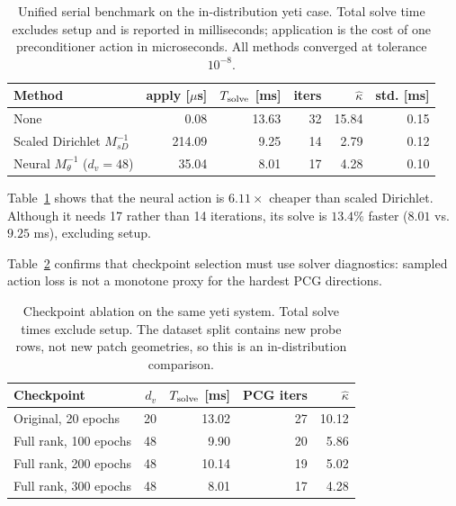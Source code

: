 \documentclass{article}
\newcommand{\Psd}{M_{sD}^{-1}}                   %
\newcommand{\Pneural}{M_{\theta}^{-1}}            %
\newcommand{\dv}{d_v}                             %
\theoremstyle{plain}
\numberwithin{equation}{section}
\begin{document}
\begin{table}[ht]
    \centering
    \caption{Unified serial benchmark on the in-distribution yeti case.  Total
        solve time excludes setup and is reported in milliseconds; application is
        the cost of one preconditioner action in microseconds.  All methods converged
        at tolerance $10^{-8}$.}
    \label{tab:nn-comparison}
    \small
    \begin{tabular}{lrrrrr}
        \toprule
        Method                       & apply [$\mu$s] & $T_{\rm solve}$ [ms] & iters &
        $\widehat\kappa$             & std. [ms]                                                    \\
        \midrule
        None                         & 0.08           & 13.63                & 32    & 15.84 & 0.15 \\
        Scaled Dirichlet $\Psd$      & 214.09         & 9.25                 & 14    & 2.79  & 0.12 \\
        Neural $\Pneural$ ($\dv=48$) & 35.04          & 8.01                 & 17    & 4.28  & 0.10 \\
        \bottomrule
    \end{tabular}
\end{table}

Table~\ref{tab:nn-comparison} shows that the neural action is $6.11\times$
cheaper than scaled Dirichlet.  Although it
needs 17 rather than 14 iterations, its solve is $13.4\%$ faster
($8.01$ vs.\ $9.25$ ms), excluding setup.


Table~\ref{tab:nn-training-ablation} confirms that checkpoint selection must
use solver diagnostics: sampled action loss is not a monotone proxy for the
hardest PCG directions.

\begin{table}[ht]
    \centering
    \caption{Checkpoint ablation on the same yeti system.  Total solve times
        exclude setup.  The dataset split contains new probe rows, not new patch
        geometries, so this is an in-distribution comparison.}
    \label{tab:nn-training-ablation}
    \begin{tabular}{lrrrr}
        \toprule
        Checkpoint            & $\dv$ & $T_{\rm solve}$ [ms] & PCG iters & $\widehat\kappa$ \\
        \midrule
        Original, 20 epochs   & 20    & 13.02                & 27        & 10.12            \\
        Full rank, 100 epochs & 48    & 9.90                 & 20        & 5.86             \\
        Full rank, 200 epochs & 48    & 10.14                & 19        & 5.02             \\
        Full rank, 300 epochs & 48    & 8.01                 & 17        & 4.28             \\
        \bottomrule
    \end{tabular}
\end{table}
\end{document}
